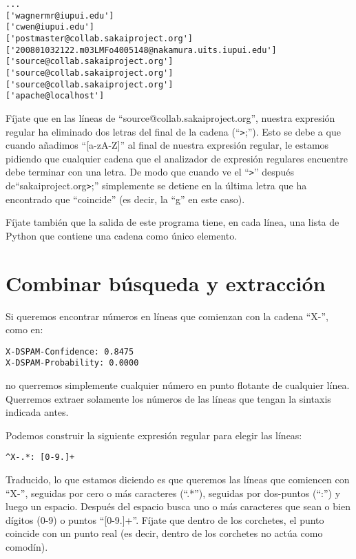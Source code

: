 \beforeverb
\begin{verbatim}
...
['wagnermr@iupui.edu']
['cwen@iupui.edu']
['postmaster@collab.sakaiproject.org']
['200801032122.m03LMFo4005148@nakamura.uits.iupui.edu']
['source@collab.sakaiproject.org']
['source@collab.sakaiproject.org']
['source@collab.sakaiproject.org']
['apache@localhost']
\end{verbatim}
\afterverb
%
Fíjate que en las líneas de ``source@collab.sakaiproject.org'', nuestra expresión regular
ha eliminado dos letras del final de la cadena (``\verb">";''). Esto se debe a que cuando
añadimos ``[a-zA-Z]'' al final de nuestra expresión regular, le estamos pidiendo que cualquier
cadena que el analizador de expresión regulares encuentre debe terminar con una letra. De modo que cuando ve el
``\verb">"'' después de``sakaiproject.org\verb">";'' simplemente se detiene en la última letra que
ha encontrado que ``coincide'' (es decir, la ``g'' en este caso).

Fíjate también que la salida de este programa tiene, en cada línea, una lista de Python que contiene una cadena como
único elemento.

\section{Combinar búsqueda y extracción}

Si queremos encontrar números en líneas que comienzan con la cadena ``X-'', como en:

\beforeverb
\begin{verbatim}
X-DSPAM-Confidence: 0.8475
X-DSPAM-Probability: 0.0000  
\end{verbatim}
\afterverb
%
no querremos simplemente cualquier número en punto flotante de cualquier línea. Querremos extraer
solamente los números de las líneas que tengan la sintaxis indicada antes.

Podemos construir la siguiente expresión regular para elegir las líneas:

\beforeverb
\begin{verbatim}
^X-.*: [0-9.]+
\end{verbatim}
\afterverb
%
Traducido, lo que estamos diciendo es que queremos las líneas que comiencen con ``X-'', seguidas por cero o
más caracteres (``.*''), seguidas por dos-puntos (``:'') y luego un espacio. Después del espacio busca
uno o más caracteres que sean o bien dígitos (0-9) o puntos ``[0-9.]+''.
Fíjate que dentro de los corchetes, el punto coincide con un punto real (es decir, dentro de los corchetes
no actúa como comodín).

